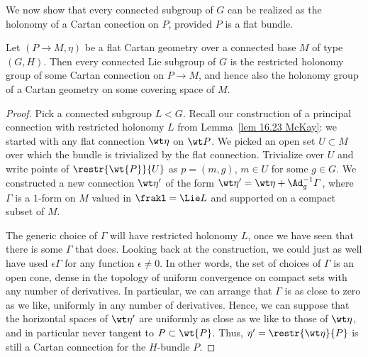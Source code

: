 We now show that every connected subgroup of $G$ can be realized as the holonomy of a Cartan conection on $P$, provided $P$ is a flat bundle.

\begin{thm}\label{thm 16.31 McKay}
    Let $(P\to M,\eta)$ be a flat Cartan geometry over a connected base $M$ of type $(G,H)$. Then every connected Lie subgroup of $G$ is the restricted holonomy group of some Cartan connection on $P\to M$, and hence also the holonomy group of a Cartan geometry on some covering space of $M$.
\end{thm}
\begin{proof}
    Pick a connected subgroup $L<G$. Recall our construction of a principal connection with restricted holonomy $L$ from Lemma~\ref{lem 16.23 McKay}: we started with any flat connection $\wt\eta$ on $\wt P$. We picked an open set $U\subset M$ over which the bundle is trivialized by the flat connection. Trivialize over $U$ and write points of $\restr{\wt{P}}{U}$ as $p=(m,g)$, $m\in U$ for some $g\in G$. We constructed a new connection $\wt\eta'$ of the form $\wt\eta'=\wt\eta+\Ad_g^{-1}\varGamma$, where $\varGamma$ is a $1$-form on $M$ valued in $\frakl=\Lie L$ and supported on a compact subset of $M$.

    The generic choice of $\varGamma$ will have restricted holonomy $L$, once we have seen that there is some $\varGamma$ that does. Looking back at the construction, we could just as well have used $\epsilon\varGamma$ for any function $\epsilon\neq 0$. In other words, the set of choices of $\varGamma$ is an open cone, dense in the topology of uniform convergence on compact sets with any number of derivatives. In particular, we can arrange that $\varGamma$ is as close to zero as we like, uniformly in any number of derivatives. Hence, we can suppose that the horizontal spaces of $\wt\eta'$ are uniformly as close as we like to those of $\wt\eta$, and in particular never tangent to $P\subset \wt{P}$. Thus, $\eta'=\restr{\wt\eta}{P}$ is still a Cartan connection for the $H$-bundle $P$.
\end{proof}

